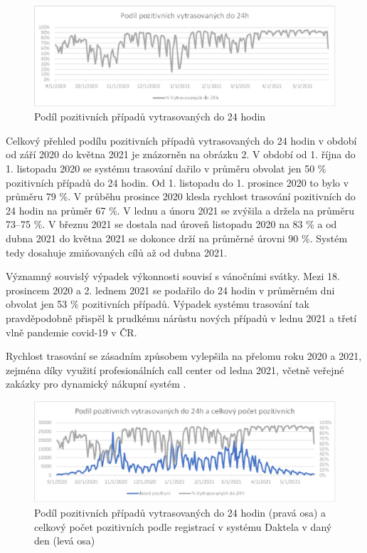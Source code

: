 \begin{figure}[ht]
    \centering
    \includegraphics[width=1\textwidth]{./pic/a.eps}
    \caption{Podíl pozitivních případů vytrasovaných do 24 hodin}
    \label{fig:pozitivni24}
\end{figure}

Celkový přehled podílu pozitivních případů vytrasovaných do 24 hodin v období od září 2020 do května 2021 je znázorněn na obrázku 2. V období od 1. října do 1. listopadu 2020 se systému trasování dařilo v průměru obvolat jen 50 \% pozitivních případů do 24 hodin. Od 1. listopadu do 1. prosince 2020 to bylo v průměru 79 \%. V průběhu prosince 2020 klesla rychlost trasování pozitivních do 24 hodin na průměr 67 \%. V lednu a únoru 2021 se zvýšila a držela na průměru 73--75 \%. V březnu 2021 se dostala nad úroveň listopadu 2020 na 83 \% a od dubna 2021 do května 2021 se dokonce drží na průměrné úrovni 90 \%. Systém tedy dosahuje zmiňovaných cílů až od dubna 2021.

Významný souvislý výpadek výkonnosti souvisí s vánočními svátky. Mezi 18. prosincem 2020 a 2. lednem 2021 se podařilo do 24 hodin v průměrném dni obvolat jen 53 \% pozitivních případů. Výpadek systému trasování tak pravděpodobně přispěl k prudkému nárůstu nových případů v lednu 2021 a třetí vlně pandemie covid-19 v ČR.

Rychlost trasování se zásadním způsobem vylepšila na přelomu roku 2020 a 2021, zejména díky využití profesionálních call center od ledna 2021, včetně veřejné zakázky pro dynamický nákupní systém \cite{tr_hlidac01}.

\begin{figure}[ht]
    \centering
    \includegraphics[width=1\textwidth]{./pic/b.eps}
    \caption{Podíl pozitivních případů vytrasovaných do 24 hodin (pravá osa) a celkový počet pozitivních podle registrací v systému Daktela v daný den (levá osa)}
    \label{fig:pozitivni24_3}
\end{figure}

